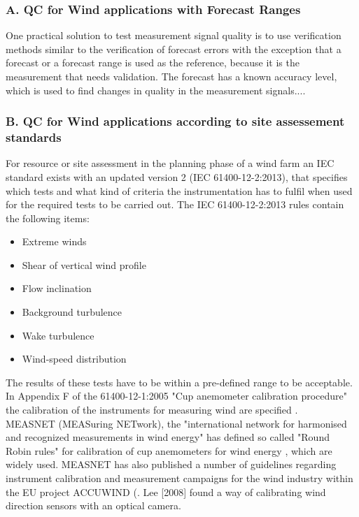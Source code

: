 \subsubsection{A. QC for Wind applications with Forecast Ranges}\label{subsubsec:real-time_qc_forecast_ranges}
One practical solution to test measurement signal quality is to use verification methods similar to the verification of forecast errors with the exception that a forecast or a forecast range is used as the reference, because it is the measurement that needs validation. The forecast has a known accuracy level, which is used to find changes in quality in the measurement signals....

\subsubsection{B. QC for Wind applications according to site assessement standards}

For resource or site assessment in the planning phase of a wind farm an IEC standard exists \citep{iec17025-2005E} with an updated version 2 (IEC 61400-12-2:2013), that specifies which tests and what kind of criteria the instrumentation has to fulfil when used for the required tests to be carried out. The IEC 61400-12-2:2013 rules contain the following items:
\begin{itemize}
    \item Extreme winds
    \item Shear of vertical wind profile
    \item Flow inclination
    \item Background turbulence
    \item Wake turbulence
    \item Wind-speed distribution
\end{itemize}

The results of these tests have to be within a pre-defined range to be acceptable. In Appendix F of the 61400-12-1:2005 "Cup anemometer calibration procedure" the calibration of the instruments for measuring wind are specified \cite{iec61400-12-1-2005}.\\


MEASNET (MEASuring NETwork), the "international network for harmonised and recognized measurements in wind energy" has defined so called "Round Robin rules" for calibration of cup anemometers for wind energy \cite{measnet2009}, which are widely used. MEASNET has also  published a number of guidelines regarding instrument calibration and measurement campaigns for the wind industry within the EU project ACCUWIND (\cite{Dahlberg2006,Pedersen2006, Eecen2006}. Lee [2008] found a way of calibrating wind direction sensors with an optical camera.


